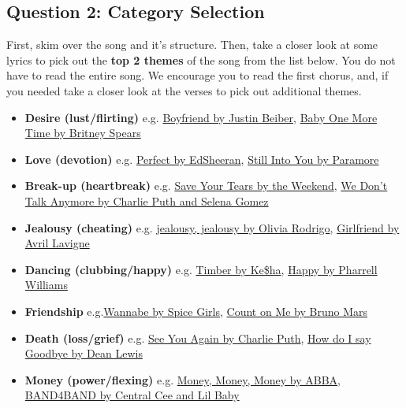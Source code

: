 \documentclass{article}
\begin{document}
\subsection{Question 2: Category Selection}

First, skim over the song and it's structure. Then, take a closer look at some lyrics to pick out the \textbf{top 2 themes} of the song from the list below. You do not have to read the entire song. We encourage you to read the first chorus, and, if you needed take a closer look at the verses to pick out additional themes.


\begin{itemize}
    \item \textbf{Desire (lust/flirting)} e.g. \href{https://www.youtube.com/watch?v=xYoxBQ03wUQ}{Boyfriend by Justin Beiber}, \href{https://www.youtube.com/watch?v=C-u5WLJ9Yk4}{Baby One More Time by Britney Spears}
    \item \textbf{Love (devotion)} e.g. \href{https://www.youtube.com/watch?v=2Vv-BfVoq4g}{Perfect by EdSheeran}, \href{https://www.youtube.com/watch?v=OblL026SvD4}{Still Into You by Paramore}
    \item \textbf{Break-up (heartbreak)} e.g. \href{https://www.youtube.com/watch?v=XXYlFuWEuKI}{Save Your Tears by the Weekend}, \href{https://www.youtube.com/watch?v=3AtDnEC4zak}{We Don't Talk Anymore by Charlie Puth and Selena Gomez}
    \item \textbf{Jealousy (cheating)} e.g. \href{https://www.youtube.com/watch?v=Z-9gQjUZMm0}{jealousy, jealousy by Olivia Rodrigo}, \href{https://www.youtube.com/watch?v=Bg59q4puhmg}{Girlfriend by Avril Lavigne} 
     \item \textbf{Dancing (clubbing/happy)} e.g. \href{https://www.youtube.com/watch?v=hHUbLv4ThOo}{Timber by Ke\$ha}, \href{https://www.youtube.com/watch?v=ZbZSe6N_BXs}{Happy by Pharrell Williams}
    \item \textbf{Friendship} e.g.\href{https://www.youtube.com/watch?v=gJLIiF15wjQ}{Wannabe by Spice Girls}, \href{https://www.youtube.com/watch?v=6k8cpUkKK4c}{Count on Me by Bruno Mars}
    \item \textbf{Death (loss/grief)} e.g. \href{https://www.youtube.com/watch?v=RgKAFK5djSk}{See You Again by Charlie Puth}, \href{https://www.youtube.com/watch?v=QCtEe-zsCtQ&list=RDQMC5eUFF-35-k&index=9}{How do I say Goodbye by Dean Lewis}
    \item \textbf{Money (power/flexing)} e.g. \href{https://www.youtube.com/watch?v=ETxmCCsMoD0}{Money, Money, Money by ABBA}, \href{https://www.youtube.com/watch?v=pDddlvCfTiw}{BAND4BAND by Central Cee and Lil Baby}

\end{itemize}
\end{document}
